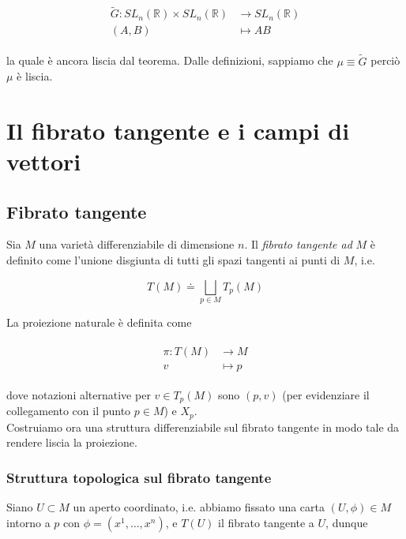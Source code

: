 \begin{align}
	\begin{split}
		\tilde{G} : SL_{n}(\mathbb{R}) \times SL_{n}(\mathbb{R}) &\to SL_{n}(\mathbb{R})\\
		(A,B) &\mapsto A B
	\end{split}
\end{align}

la quale è ancora liscia dal teorema. Dalle definizioni, sappiamo che $ \mu \equiv \tilde{G} $ perciò $ \mu $ è liscia.

\section{Il fibrato tangente e i campi di vettori}

\subsection{Fibrato tangente}

Sia $ M $ una varietà differenziabile di dimensione $ n $. Il \textit{fibrato tangente ad} $ M $ è definito come l'unione disgiunta di tutti gli spazi tangenti ai punti di $ M $, i.e.

\begin{equation}
	T(M) \doteq \bigsqcup_{p \in M} T_{p}(M)
\end{equation}

La proiezione naturale è definita come

\begin{align}
	\begin{split}
		\pi : T(M) &\to M\\
		v &\mapsto p
	\end{split}
\end{align}

dove notazioni alternative per $ v \in T_{p}(M) $ sono $ (p,v) $ (per evidenziare il collegamento con il punto $ p \in M $) e $ X_{p} $.\\
Costruiamo ora una struttura differenziabile sul fibrato tangente in modo tale da rendere liscia la proiezione.

\subsubsection{Struttura topologica sul fibrato tangente}

Siano $ U \subset M $ un aperto coordinato, i.e. abbiamo fissato una carta $ (U,\phi) \in M $ intorno a $ p $ con $ \phi = (x^{1},\dots,x^{n}) $, e $ T(U) $ il fibrato tangente a $ U $, dunque


